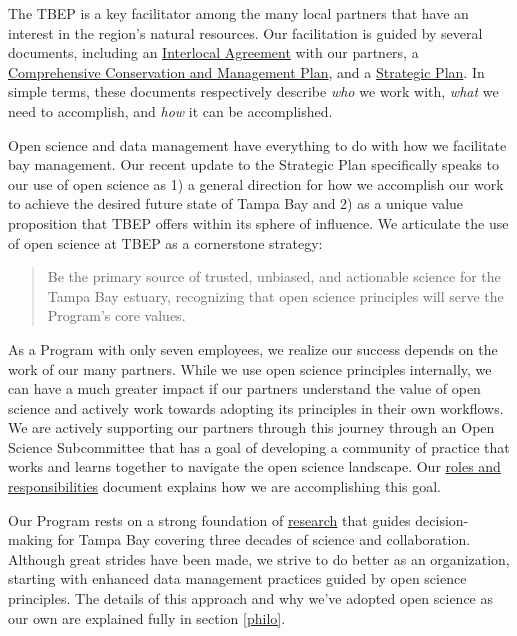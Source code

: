 \documentclass[
]{book}
\begin{document}
The TBEP is a key facilitator among the many local partners that have an interest in the region's natural resources. Our facilitation is guided by several documents, including an \href{https://drive.google.com/file/d/1iJcWxmc5SeyDTqiCQ3MLQGWEY_EDGtZT/view?usp=sharing}{Interlocal Agreement} with our partners, a \href{https://indd.adobe.com/view/cf7b3c48-d2b2-4713-921c-c2a0d4466632}{Comprehensive Conservation and Management Plan}, and a \href{https://drive.google.com/file/d/11xohuoaHDxNHRqgXoOHdI37FpWvac_rn/view?usp=sharing}{Strategic Plan}. In simple terms, these documents respectively describe \emph{who} we work with, \emph{what} we need to accomplish, and \emph{how} it can be accomplished.

Open science and data management have everything to do with how we facilitate bay management. Our recent update to the Strategic Plan specifically speaks to our use of open science as 1) a general direction for how we accomplish our work to achieve the desired future state of Tampa Bay and 2) as a unique value proposition that TBEP offers within its sphere of influence. We articulate the use of open science at TBEP as a cornerstone strategy:

\begin{quote}
Be the primary source of trusted, unbiased, and actionable science for the Tampa Bay estuary, recognizing that open science principles will serve the Program's core values.
\end{quote}

As a Program with only seven employees, we realize our success depends on the work of our many partners. While we use open science principles internally, we can have a much greater impact if our partners understand the value of open science and actively work towards adopting its principles in their own workflows. We are actively supporting our partners through this journey through an Open Science Subcommittee that has a goal of developing a community of practice that works and learns together to navigate the open science landscape. Our \href{https://docs.google.com/document/d/1w6dVTwfYYDRVzGPXy0jyHxV4mwOutEY_ISMP1oAdZ_c/edit}{roles and responsibilities} document explains how we are accomplishing this goal.

Our Program rests on a strong foundation of \href{https://tbep.org/our-work/library/}{research} that guides decision-making for Tampa Bay covering three decades of science and collaboration. Although great strides have been made, we strive to do better as an organization, starting with enhanced data management practices guided by open science principles. The details of this approach and why we've adopted open science as our own are explained fully in section \ref{philo}.
\end{document}
